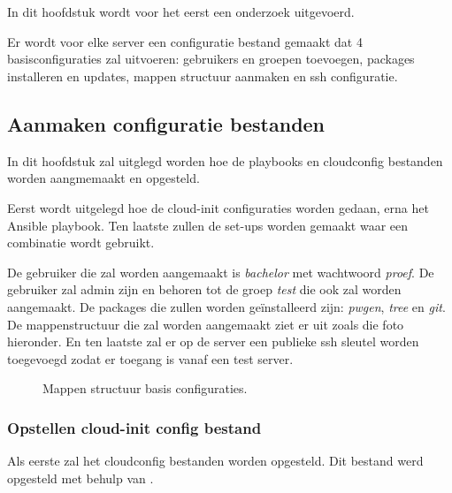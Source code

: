 \chapter{}
\label{ch:basisconf}
In dit hoofdstuk wordt voor het eerst een onderzoek uitgevoerd. 

Er wordt voor elke server een configuratie bestand gemaakt dat 4 basisconfiguraties zal uitvoeren: gebruikers en groepen toevoegen, packages installeren en updates, mappen structuur aanmaken en ssh configuratie. 


\section{Aanmaken configuratie bestanden}
In dit hoofdstuk zal uitglegd worden hoe de playbooks en cloudconfig bestanden worden aangmemaakt en opgesteld. 

Eerst wordt uitgelegd hoe de cloud-init configuraties worden gedaan, erna het Ansible playbook. Ten laatste zullen de set-ups worden gemaakt waar een combinatie wordt gebruikt.

De gebruiker die zal worden aangemaakt is \textit{bachelor} met wachtwoord \textit{proef}. De gebruiker zal admin zijn en behoren tot de groep \textit{test} die ook zal worden aangemaakt. De packages die zullen worden geïnstalleerd zijn: \textit{pwgen}, \textit{tree} en \textit{git}. De mappenstructuur die zal worden aangemaakt ziet er uit zoals die foto hieronder. En ten laatste zal er op de server een publieke ssh sleutel worden toegevoegd zodat er toegang is vanaf een test server.

\begin{figure}[!htb]
    \caption{Mappen structuur basis configuraties.}
    \label{fig:mappen}
\end{figure}
\subsection{Opstellen cloud-init config bestand}
Als eerste zal het cloudconfig bestanden worden opgesteld. Dit bestand werd opgesteld met behulp van \autocite{clouddocs}.

